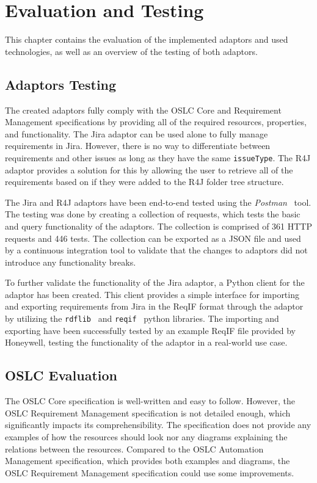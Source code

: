 
\chapter{Evaluation and Testing}
\label{chapter:evaluation}
This chapter contains the evaluation of the implemented adaptors and used technologies, as well as an overview of the testing of both adaptors.

\section{Adaptors Testing}
The created adaptors fully comply with the OSLC Core and Requirement Management specifications by providing all of the required resources, properties, and functionality. The Jira adaptor can be used alone to fully manage requirements in Jira. However, there is no way to differentiate between requirements and other issues as long as they have the same \texttt{issueType}. The R4J adaptor provides a solution for this by allowing the user to retrieve all of the requirements based on if they were added to the R4J folder tree structure.

The Jira and R4J adaptors have been end-to-end tested using the \emph{Postman} \cite{postman} tool. The testing was done by creating a collection of requests, which tests the basic and query functionality of the adaptors. The collection is comprised of 361 HTTP requests and 446 tests. The collection can be exported as a JSON file and used by a continuous integration tool to validate that the changes to adaptors did not introduce any functionality breaks.

To further validate the functionality of the Jira adaptor, a Python client for the adaptor has been created. This client provides a simple interface for importing and exporting requirements from Jira in the ReqIF format through the adaptor by utilizing the \texttt{rdflib} \cite{python_rdflib} and \texttt{reqif} \cite{python_reqif} python libraries. The importing and exporting have been successfully tested by an example ReqIF file provided by Honeywell, testing the functionality of the adaptor in a real-world use case.


\section{OSLC Evaluation}
The OSLC Core specification is well-written and easy to follow. However, the OSLC Requirement Management specification is not detailed enough, which significantly impacts its comprehensibility. The specification does not provide any examples of how the resources should look nor any diagrams explaining the relations between the resources. Compared to the OSLC Automation Management specification, which provides both examples and diagrams, the OSLC Requirement Management specification could use some improvements.

